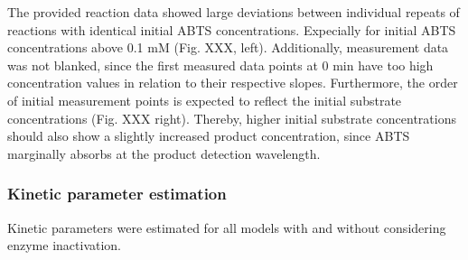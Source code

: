 \documentclass[letterpaper,10pt,english]{jupyterBook}
\begin{document}
\sphinxAtStartPar
The provided reaction data showed large deviations between individual repeats of reactions with identical initial ABTS concentrations. Expecially for initial ABTS concentrations above 0.1 mM (Fig. XXX, left). Additionally, measurement data was not blanked, since the first measured data points at 0 min have too high concentration values in relation to their respective slopes.
Furthermore, the order of initial measurement points is expected to reflect the initial substrate concentrations (Fig. XXX right). Thereby, higher initial substrate concentrations should also show a slightly increased product concentration, since ABTS marginally absorbs at the product detection wavelength.


\subsubsection{Kinetic parameter estimation}
\label{\detokenize{scenarios/enzyme_inactivation:kinetic-parameter-estimation}}
\sphinxAtStartPar
Kinetic parameters were estimated for all models with and without considering enzyme inactivation.
\end{document}
